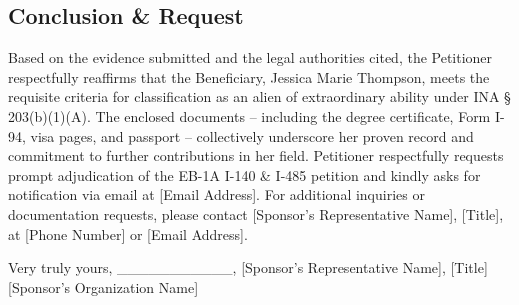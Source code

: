 \subsection*{Conclusion \& Request}

Based on the evidence submitted and the legal authorities cited, the Petitioner respectfully reaffirms that the Beneficiary, Jessica Marie Thompson, meets the requisite criteria for classification as an alien of extraordinary ability under INA § 203(b)(1)(A). The enclosed documents – including the degree certificate, Form I-94, visa pages, and passport – collectively underscore her proven record and commitment to further contributions in her field. Petitioner respectfully requests prompt adjudication of the EB-1A I-140 \& I-485 petition and kindly asks for notification via email at [Email Address]. For additional inquiries or documentation requests, please contact [Sponsor’s Representative Name], [Title], at [Phone Number] or [Email Address].

Very truly yours,
\_\_\_\_\_\_\_\_\_\_\_,
[Sponsor’s Representative Name], [Title]
[Sponsor’s Organization Name]